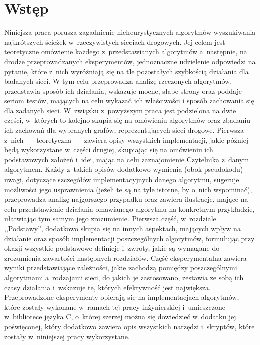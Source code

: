 \chapter{Wstęp}

Niniejsza praca porusza zagadnienie nieheurystycznych algorytmów wyszukiwania najkrótszych ścieżek w~rzeczywistych sieciach drogowych. Jej celem jest teoretyczne omówienie każdego z~przedstawianych algorytmów a~następnie, na drodze przeprowadzanych eksperymentów, jednoznaczne udzielenie odpowiedzi na pytanie, które z~nich wyróżniają się na tle pozostałych szybkością działania dla badanych sieci. W tym celu przeprowadza analizę rzeczonych algorytmów, przedstawia sposób ich działania, wskazuje mocne, słabe strony oraz poddaje seriom testów, mających na celu wykazać ich właściwości i sposób zachowania się dla zadanych sieci. W~związku z~powyższym praca jest podzielona na dwie części, w~których to kolejno skupia się na omówieniu algorytmów oraz zbadaniu ich zachowań dla wybranych grafów, reprezentujących sieci drogowe. Pierwsza z~nich~--- teoretyczna~--- zawiera opisy wszystkich implementacji, jakie później będą wykorzystane w~części drugiej, skupiając się na omówieniu ich podstawowych założeń i~idei, mając na celu zaznajomienie Czytelnika z~danym algorytmem. Każdy z~takich opisów dodatkowo wymienia (obok pseudokodu) uwagi, dotyczące szczegółów implementacyjnych danego algorytmu, sugeruje możliwości jego usprawnienia (jeżeli te są na tyle istotne, by o~nich wspominać), przeprowadza analizę najgorszego przypadku oraz zawiera ilustracje, mające na celu przedstawienie działania omawianego algorytmu na konkretnym przykładzie, ułatwiając tym samym jego zrozumienie. Pierwsza część, w~rozdziale ,,Podstawy'', dodatkowo skupia się na innych aspektach, mających wpływ na działanie oraz sposób implementacji poszczególnych algorytmów, formułując przy okazji wszystkie podstawowe definicje i~zwroty, jakie są wymagane do zrozumienia zawartości następnych rozdziałów. Część eksperymentalna zawiera wyniki przedstawiające zależności, jakie zachodzą pomiędzy poszczególnymi algorytmami a~rodzajami sieci, do jakich je zastosowano, zestawia ze sobą ich czasy działania i~wskazuje te, których efektywność jest największa. Przeprowadzone eksperymenty opierają się na implementacjach algorytmów, które zostały wykonane w~ramach tej pracy inżynierskiej i~umieszczone w~bibliotece języka \textsc{C}, o~której szerzej można się dowiedzieć w~dodatku jej poświęconej, który dodatkowo zawiera opis wszystkich narzędzi i~skryptów, które zostały w~niniejszej pracy wykorzystane.

